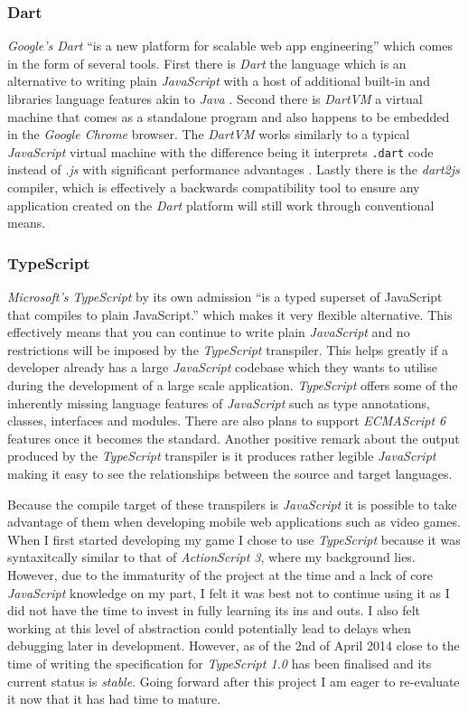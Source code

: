 \documentclass[final]{cmpreport}
\begin{document}
\subsubsection{Dart}
\textit{Google's Dart} ``is a new platform for scalable web app engineering'' which comes in the form of several tools. First there is \textit{Dart} the language which is an alternative to writing plain \textit{JavaScript} with a host of additional built-in and libraries language features akin to \textit{Java} \cite{Fortuna}. Second there is \textit{DartVM} a virtual machine that comes as a standalone program and also happens to be embedded in the \textit{Google Chrome} browser. The \textit{DartVM} works similarly to a typical \textit{JavaScript} virtual machine with the difference being it interprets \texttt{.dart} code instead of \textit{.js} with significant performance advantages \cite{Schneider}. Lastly there is the \textit{dart2js} compiler, which is effectively a backwards compatibility tool to ensure any application created on the \textit{Dart} platform will still work through conventional means.

\subsubsection{TypeScript}
\textit{Microsoft's TypeScript} by its own admission ``is a typed superset of JavaScript that compiles to plain JavaScript.'' which makes it very flexible alternative. This effectively means that you can continue to write plain \textit{JavaScript} and no restrictions will be imposed by the \textit{TypeScript} transpiler. This helps greatly if a developer already has a large \textit{JavaScript} codebase which they wants to utilise during the development of a large scale application. \textit{TypeScript} offers some of the inherently missing language features of \textit{JavaScript} such as type annotations, classes, interfaces and modules. There are also plans to support \textit{ECMAScript 6} features once it becomes the standard. Another positive remark about the output produced by the \textit{TypeScript} transpiler is it produces rather legible \textit{JavaScript} making it easy to see the relationships between the source and target languages.

Because the compile target of these transpilers is \textit{JavaScript} it is possible to take advantage of them when developing mobile web applications such as video games. When I first started developing my game I chose to use \textit{TypeScript} because it was syntaxitcally similar to that of \textit{ActionScript 3}, where my background lies. However, due to the immaturity of the project at the time and a lack of core \textit{JavaScript} knowledge on my part, I felt it was best not to continue using it as I did not have the time to invest in fully learning its ins and outs. I also felt working at this level of abstraction could potentially lead to delays when debugging later in development. However, as of the 2nd of April 2014 close to the time of writing the specification for \textit{TypeScript 1.0} has been finalised and its current status is \textit{stable}. Going forward after this project I am eager to re-evaluate it now that it has had time to mature.
\end{document}
